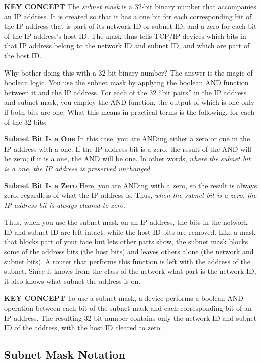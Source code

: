 {\textbf{KEY CONCEPT}} The {\emph{subnet mask}} is a 32-bit binary
number that accompanies an IP address. It is created so that it has a
one bit for each corresponding bit of the IP address that is part of its
network ID or subnet ID, and a zero for each bit of the IP address's
host ID. The mask thus tells TCP/IP devices which bits in that IP
address belong to the network ID and subnet ID, and which are part of
the host ID.

Why bother doing this with a 32-bit binary number? The answer is the
magic of boolean logic. You use the subnet mask by applying the boolean
AND function between it and the IP address. For each of the 32 ``bit
pairs'' in the IP address and subnet mask, you employ the AND function,
the output of which is one only if both bits are one. What this means in
practical terms is the following, for each of the 32 bits:

{\textbf{Subnet Bit Is a One}} In this case, you are ANDing either a
zero or one in the IP address with a one. If the IP address bit is a
zero, the result of the AND will be zero; if it is a one, the AND will
be one. In other words, {\emph{where the subnet bit is a one, the IP
address is preserved unchanged}}.

{\textbf{Subnet Bit Is a Zero}} Here, you are ANDing with a zero, so the
result is always zero, regardless of what the IP address is. Thus,
{\emph{when the subnet bit is a zero, the IP address bit is always
cleared to zero}}.

Thus, when you use the subnet mask on an IP address, the bits in the
network ID and subnet ID are left intact, while the host ID bits are
removed. Like a mask that blocks part of your face but lets other parts
show, the subnet mask blocks some of the address bits (the host bits)
and leaves others alone (the network and subnet bits). A router that
performs this function is left with the address of the subnet. Since it
knows from the class of the network what part is the network ID, it also
knows what subnet the address is on.


{\textbf{KEY CONCEPT}} To use a subnet mask, a device performs a boolean
AND operation between each bit of the subnet mask and each corresponding
bit of an IP address. The resulting 32-bit number contains only the
network ID and subnet ID of the address, with the host ID cleared to
zero.



\subsection{Subnet Mask Notation}

